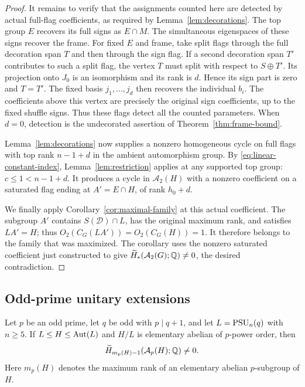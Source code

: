 \begin{proof}
It remains to verify that the assignments counted here are detected by
actual full-flag coefficients, as required by Lemma~\ref{lem:decorations}.
The top group $E$ recovers its full signs as $E\cap M$.
The simultaneous eigenspaces of these signs recover the frame.
For fixed $E$ and frame, take split flags through the full decoration
span $T$ and then through the sign flag.  If a second decoration span
$T'$ contributes to such a split flag, the vertex $T$ must split with
respect to $S\oplus T'$.  Its projection onto $J_0$ is an isomorphism
and its rank is $d$.  Hence its sign part is zero and $T=T'$.
The fixed basis $j_1,\ldots,j_d$ then recovers the individual $b_i$.
The coefficients above this vertex are precisely the original sign
coefficients, up to the fixed shuffle signs.  Thus these flags detect
all the counted parameters.  When $d=0$, detection is the undecorated
assertion of Theorem~\ref{thm:frame-bound}.

Lemma~\ref{lem:decorations} now supplies a nonzero homogeneous cycle
on full flags with top rank $n-1+d$ in the ambient automorphism group.
By \eqref{eq:linear-constant-index}, Lemma~\ref{lem:restriction} applies
at any supported top group: $c\le1<n-1+d$.  It produces a cycle in
$\mathcal A_2(H)$ with a nonzero coefficient on a saturated flag ending
at $A'=E\cap H$, of rank $h_0+d$.

We finally apply Corollary~\ref{cor:maximal-family} at this actual
coefficient.  The subgroup
$A'$ contains $S(\mathcal D)\cap L$, has the original maximum rank,
and satisfies $LA'=H$; thus $O_2(C_G(LA'))=O_2(C_G(H))=1$.
It therefore belongs to the family that was maximized.  The corollary
uses the nonzero saturated coefficient just constructed to give
$\widetilde H_*(\mathcal A_2(G);\mathbb Q)\ne0$, the desired contradiction.
\end{proof}

\subsection{Odd-prime unitary extensions}

\begin{proposition}\label{prop:unitary-odd}
Let $p$ be an odd prime, let $q$ be odd with $p\mid q+1$, and let
$L=\operatorname{PSU}_n(q)$ with $n\ge5$.  If $L\le H\le\operatorname{Aut}(L)$ and $H/L$ is
elementary abelian of $p$-power order, then
\[
 \widetilde H_{m_p(H)-1}(\mathcal A_p(H);\mathbb Q)\ne0.
\]
Here $m_p(H)$ denotes the maximum rank of an elementary abelian
$p$-subgroup of $H$.
\end{proposition}

